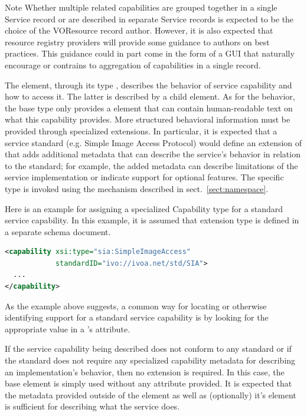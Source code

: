 \documentclass[11pt,a4paper]{ivoa}
\begin{document}
\begin{admonition}{Note}
Whether multiple related capabilities are grouped together in a
single Service record or are described in separate Service
records is expected to be the choice of the VOResource record
author.  However, it is also expected that resource registry
providers will provide some guidance to authors on best
practices.  This guidance could in part come in the form of a
GUI that naturally encourage or contrains to aggregation of
capabilities in a single record.
\end{admonition}

The  element, through its type ,
describes the behavior of service capability and how to access it.  The
latter is described by a child  element.  As for the
behavior, the base  type only provides a
 element that can contain human-readable text on what
this capability provides.  More structured behavioral information must
be provided through specialized  extensions.  In
particular, it is expected that a service standard (e.g. Simple Image
Access Protocol) would define an extension of  that
adds additional metadata that can describe the service's behavior in
relation to the standard; for example, the added metadata can describe
limitations of the service implementation or indicate support for
optional features.  The specific  type is invoked
using the  mechanism described in
sect.~\ref{sect:namespace}.


Here is an example for assigning a specialized Capability type for
a standard service capability.  In this example, it is assumed that
 extension type is defined in a separate
schema document.
\begin{lstlisting}[language=XML]
<capability xsi:type="sia:SimpleImageAccess"
            standardID="ivo://ivoa.net/std/SIA">
  ...
</capability>
\end{lstlisting}


As the example above suggests, a common way for locating or otherwise
identifying support for a standard service capability is by looking for
the appropriate value in a 's 
attribute.  


If the service capability being described does not conform to any
standard or if the standard does not require any specialized
capability metadata for describing an implementation's behavior, then
no  extension is required.  In this case,
the base  element is simply used without any
 attribute provided.  It is expected that the
metadata provided outside of the  element as
well as (optionally) it's  element is
sufficient for describing what the service does.  
\end{document}
